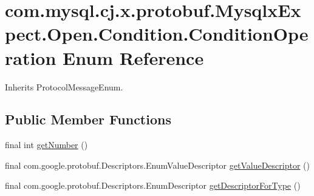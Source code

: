 \hypertarget{enumcom_1_1mysql_1_1cj_1_1x_1_1protobuf_1_1_mysqlx_expect_1_1_open_1_1_condition_1_1_condition_operation}{}\section{com.\+mysql.\+cj.\+x.\+protobuf.\+Mysqlx\+Expect.\+Open.\+Condition.\+Condition\+Operation Enum Reference}
\label{enumcom_1_1mysql_1_1cj_1_1x_1_1protobuf_1_1_mysqlx_expect_1_1_open_1_1_condition_1_1_condition_operation}


Inherits Protocol\+Message\+Enum.

\subsection*{Public Member Functions}
\begin{DoxyCompactItemize}
\item 
final int \mbox{\hyperlink{enumcom_1_1mysql_1_1cj_1_1x_1_1protobuf_1_1_mysqlx_expect_1_1_open_1_1_condition_1_1_condition_operation_abc3ef8b67d80ce8bfee28517286360d4}{get\+Number}} ()
\item 
final com.\+google.\+protobuf.\+Descriptors.\+Enum\+Value\+Descriptor \mbox{\hyperlink{enumcom_1_1mysql_1_1cj_1_1x_1_1protobuf_1_1_mysqlx_expect_1_1_open_1_1_condition_1_1_condition_operation_ab4e3d362cd48ea1db7418809937c5da6}{get\+Value\+Descriptor}} ()
\item 
final com.\+google.\+protobuf.\+Descriptors.\+Enum\+Descriptor \mbox{\hyperlink{enumcom_1_1mysql_1_1cj_1_1x_1_1protobuf_1_1_mysqlx_expect_1_1_open_1_1_condition_1_1_condition_operation_a36a3123f22d39dedf0da0ef72b1057a1}{get\+Descriptor\+For\+Type}} ()
\end{DoxyCompactItemize}
